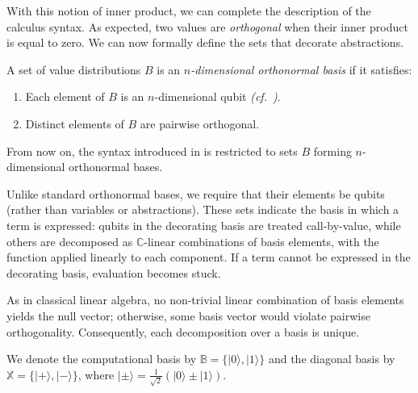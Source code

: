 \documentclass[runningheads,orivec,envcountsame,envcountsect]{llncs}
\providecommand{\qed}{\hbox{\rule{1ex}{1ex}}}%
\newcommand\ket[1]{\ensuremath{|#1\rangle}}
\def\C{\mathbb{C}}            %
\newcommand\B{\mathbb B}
\newcommand\XB{\mathbb X}
\begin{document}
With this notion of inner product, we can complete the description of the
calculus syntax. As expected, two values are \emph{orthogonal} when their inner
product is equal to zero. We can now formally define the sets that
decorate abstractions.
\begin{definition}[Basis]\label{def:NthDimensionalBasis}
  A set of value distributions $B$ is an \emph{$n$-dimensional orthonormal
  basis} if it satisfies:
  \begin{enumerate}
    \item Each element of $B$ is an $n$-dimensional qubit \emph{(cf.~)}.
    \item Distinct elements of $B$ are pairwise orthogonal.
  \end{enumerate}
\end{definition}

From now on, the syntax introduced in 
is restricted to sets $B$ forming $n$-dimensional
orthonormal bases.


Unlike standard orthonormal bases, we require that their elements be qubits
(rather than variables or abstractions).  
These sets indicate the basis in which a term is expressed: qubits in the
decorating basis are treated call-by-value, while others are decomposed as
$\C$-linear combinations of basis elements, with the function applied linearly
to each component.  If a term cannot be expressed in the decorating basis,
evaluation becomes stuck.

As in classical linear algebra, no non-trivial linear combination of basis
elements yields the null vector; otherwise, some basis vector would violate
pairwise orthogonality. Consequently, each decomposition over a basis is
unique.



We denote the computational basis by $\B=\{\ket{0},\ket{1}\}$ and the diagonal
basis by $\XB=\{\ket{+},\ket{-}\}$, where
$\ket{\pm}=\tfrac{1}{\sqrt{2}}(\ket{0}\pm\ket{1})$.  
\end{document}
